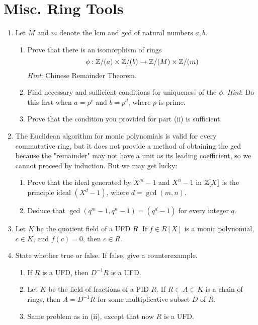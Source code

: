 \documentclass[../psets.tex]{subfiles}
\begin{document}
\section{Misc. Ring Tools}
\begin{enumerate}
    \item {}Let $M$ and $m$ denote the lcm and gcd of natural numbers $a,b$.
    \begin{enumerate}
        \item Prove that there is an isomorphism of rings
        \begin{equation*}
            \phi:\mathbb{Z}/(a)\times\mathbb{Z}/(b)\to\mathbb{Z}/(M)\times\mathbb{Z}/(m)
        \end{equation*}
        \emph{Hint}: Chinese Remainder Theorem.
        \item Find necessary and sufficient conditions for uniqueness of the $\phi$. \emph{Hint}: Do this first when $a=p^c$ and $b=p^d$, where $p$ is prime.
        \item Prove that the condition you provided for part (ii) is sufficient.
    \end{enumerate}
    \item The Euclidean algorithm for monic polynomials is valid for every commutative ring, but it does not provide a method of obtaining the gcd because the "remainder" may not have a unit as its leading coefficient, so we cannot proceed by induction. But we may get lucky:
    \begin{enumerate}
        \item Prove that the ideal generated by $X^m-1$ and $X^n-1$ in $\mathbb{Z}[X]$ is the principle ideal $(X^d-1)$, where $d=\gcd(m,n)$.
        \item Deduce that $\gcd(q^m-1,q^n-1)=(q^d-1)$ for every integer $q$.
    \end{enumerate}
    \item Let $K$ be the quotient field of a UFD $R$. If $f\in R[X]$ is a monic polynomial, $c\in K$, and $f(c)=0$, then $c\in R$.
    \item State whether true or false. If false, give a counterexample.
    \begin{enumerate}
        \item If $R$ is a UFD, then $D^{-1}R$ is a UFD.
        \item Let $K$ be the field of fractions of a PID $R$. If $R\subset A\subset K$ is a chain of rings, then $A=D^{-1}R$ for some multiplicative subset $D$ of $R$.
        \item Same problem as in (ii), except that now $R$ is a UFD.

\end{enumerate}
\end{enumerate}
\end{document}
